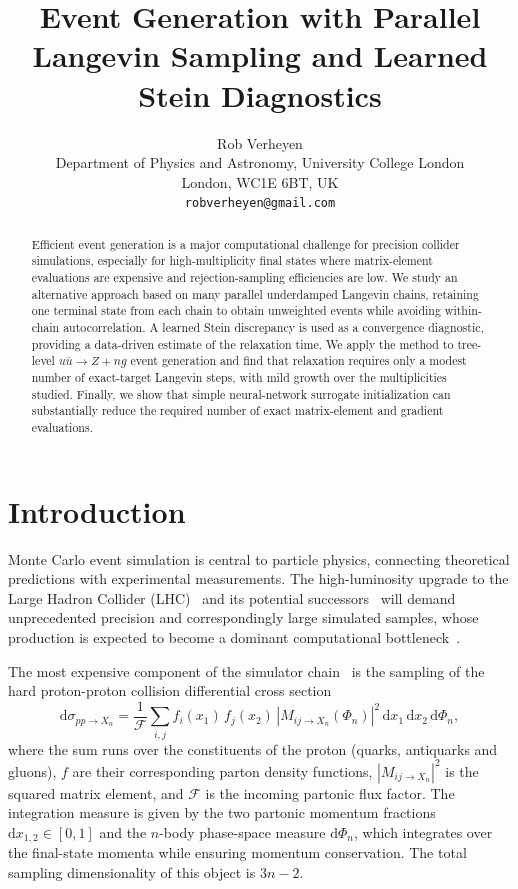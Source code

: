 \documentclass{article}
\title{Event Generation with Parallel Langevin Sampling and Learned Stein Diagnostics}
\author{
  Rob Verheyen\\
  Department of Physics and Astronomy, University College London\\
  London, WC1E 6BT, UK\\
  \texttt{robverheyen@gmail.com}
}
\date{}
\newcommand{\dd}{\mathrm{d}}
\begin{document}
\maketitle

\begin{abstract}
Efficient event generation is a major computational challenge for precision collider simulations, especially for high-multiplicity final states where matrix-element evaluations are expensive and rejection-sampling efficiencies are low.
We study an alternative approach based on many parallel underdamped Langevin chains, retaining one terminal state from each chain to obtain unweighted events while avoiding within-chain autocorrelation.
A learned Stein discrepancy is used as a convergence diagnostic, providing a data-driven estimate of the relaxation time.
We apply the method to tree-level $u\bar u\to Z+n g$ event generation and find that relaxation requires only a modest number of exact-target Langevin steps, with mild growth over the multiplicities studied.
Finally, we show that simple neural-network surrogate initialization can substantially reduce the required number of exact matrix-element and gradient evaluations.
\end{abstract}


\section{Introduction}
Monte Carlo event simulation is central to particle physics, connecting theoretical predictions with experimental measurements.
The high-luminosity upgrade to the Large Hadron Collider (LHC)~\cite{ZurbanoFernandez:2020cco} and its potential successors~\cite{FCC:2018evy,FCC:2018vvp} will demand unprecedented precision and correspondingly large simulated samples, whose production is expected to become a dominant computational bottleneck~\cite{Buckley:2011ms,Narain:2022qud,HEPSoftwareFoundation:2017ggl,HSFPhysicsEventGeneratorWG:2020gxw,EuropeanStrategyGroup:2020pow}.

The most expensive component of the simulator chain~\cite{vanBeekveld:2026uxl} is the sampling of the hard proton-proton collision differential cross section
\begin{equation} \label{cross-section}
  \dd \sigma_{p p \rightarrow X_n} = \frac{1}{\mathcal{F}} \sum_{i,j} f_i(x_1) \, f_j(x_2) \, |M_{ij \rightarrow X_n}(\Phi_n)|^2 \, \dd x_1 \, \dd x_2 \, \dd\Phi_n,
\end{equation}
where the sum runs over the constituents of the proton (quarks, antiquarks and gluons), $f$ are their corresponding parton density functions, $|M_{ij\rightarrow X_n}|^2$ is the squared matrix element, and $\mathcal{F}$ is the incoming partonic flux factor.
The integration measure is given by the two partonic momentum fractions $\dd x_{1,2} \in [0,1]$ and the $n$-body phase-space measure $\dd\Phi_n$, which integrates over the final-state momenta while ensuring momentum conservation.
The total sampling dimensionality of this object is $3n-2$.
\end{document}
